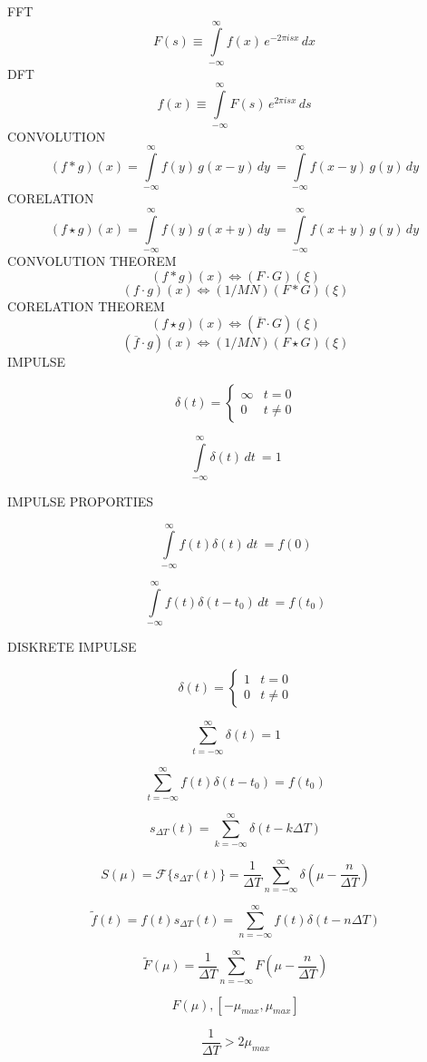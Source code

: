 \documentclass[12pt]{article}
\begin{document}
FFT
$$
F(s) 
\equiv
{\int\limits_{-\infty}^{\infty}f(x)\,e^{-2\pi i s x}\,dx~}
$$
DFT
$$
f(x) 
\equiv
{\int\limits_{-\infty}^{\infty}F(s)\,e^{2\pi i s x}\,ds~}
$$
CONVOLUTION
$$
(f*g)(x)
=
{\int\limits_{-\infty}^{\infty} f(y)\,g(x-y)\,dy~} 
=
{\int\limits_{-\infty}^{\infty} f(x-y)\,g(y)\,dy~}  
$$
CORELATION
$$
(f \star g)(x) 
= 
{\int\limits_{-\infty}^{\infty} f(y)\,g(x+y)\,dy~} 
= 
{\int\limits_{-\infty}^{\infty} f(x+y)\,g(y)\,dy~}  
$$
CONVOLUTION THEOREM
$$
{(f*g)(x)}
\Leftrightarrow 
{(F \cdot G )(\xi)}
$$
$$
{(f \cdot g)(x)}
\Leftrightarrow 
{(1/MN)(F*G )(\xi)}
$$
CORELATION THEOREM
$$
{(f \star g)(x)} 
\Leftrightarrow
{(\overline{F} \cdot G)(\xi)}
$$
$$
{(\overline{f}  \cdot g)(x)} 
\Leftrightarrow
{(1/MN)(F \star G)(\xi)}
$$
IMPULSE

$$
\delta(t)=
\begin{cases}
\infty & t = 0 \\
0	 & t \neq 0
\end{cases}
$$

$$
{\int\limits_{-\infty}^{\infty}\delta(t)\,dt~}
=
1
$$

IMPULSE PROPORTIES

$$
{\int\limits_{-\infty}^{\infty}f(t)\delta(t)\,dt~}
=
f(0)
$$

$$
{\int\limits_{-\infty}^{\infty}f(t)\delta(t-t_{0})\,dt~}
=
f(t_{0})
$$

DISKRETE IMPULSE

$$
\delta(t)=
\begin{cases}
1 & t = 0 \\
0	 & t \neq 0
\end{cases}
$$

$$
\sum_{t = - \infty}^{\infty} \delta(t) 
=
1
$$

$$
\sum_{t = - \infty}^{\infty} f(t) 
\delta(t - t_{0}) 
=
f(t_{0})
$$

$$
s_{\varDelta T}(t) 
=
\sum_{k=-\infty}^{\infty}
\delta(t - k\varDelta T)
$$

$$
S(\mu) = \mathcal{F}
\{ s_{\varDelta T}(t)  \}
=
\frac{1}{\varDelta T}
\sum_{n = - \infty}^{\infty}
\delta(
\mu - \frac{n}{\varDelta T}
)
$$

$$
\tilde{f}(t) = 
f(t)s_{\varDelta T}(t)
=
\sum_{n = -\infty}^{\infty}
f(t)
\delta(t - n\varDelta T)
$$

$$
\tilde{F}(\mu) = 
\frac{1}{\varDelta T}
\sum_{n = - \infty}^{\infty}
F(
\mu - \frac{n}{\varDelta T}
)
$$

$$
F(\mu), [-\mu_{max},\mu_{max} ]
$$

$$
\frac{1}{\varDelta T} 
>
2\mu_{max}
$$
\end{document}
